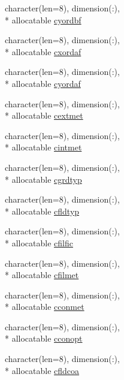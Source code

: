 \begin{DoxyCompactItemize}
\item 
character(len=8), dimension(\+:), \\*
allocatable \hyperlink{classmod__oasis__namcouple_ae1debe43f1c5cffeeb1d0d9ab563f4c4}{cyordbf}
\item 
character(len=8), dimension(\+:), \\*
allocatable \hyperlink{classmod__oasis__namcouple_ab52bc27bf5898cc85dce0fc60feb9320}{cxordaf}
\item 
character(len=8), dimension(\+:), \\*
allocatable \hyperlink{classmod__oasis__namcouple_a68de802180c51365e7d4bcc5180ac93b}{cyordaf}
\item 
character(len=8), dimension(\+:), \\*
allocatable \hyperlink{classmod__oasis__namcouple_a1066d92e6c9301bdb46ddda7edd7d29a}{cextmet}
\item 
character(len=8), dimension(\+:), \\*
allocatable \hyperlink{classmod__oasis__namcouple_ac9b9bb442cf77881bef2157c85e23495}{cintmet}
\item 
character(len=8), dimension(\+:), \\*
allocatable \hyperlink{classmod__oasis__namcouple_a795db0909c85ffadb601b744b5189ff5}{cgrdtyp}
\item 
character(len=8), dimension(\+:), \\*
allocatable \hyperlink{classmod__oasis__namcouple_ab139e7bad0413c79a5ad8e0837d3e0ef}{cfldtyp}
\item 
character(len=8), dimension(\+:), \\*
allocatable \hyperlink{classmod__oasis__namcouple_a6a69d927924d3fa391fdc3ec6cb78197}{cfilfic}
\item 
character(len=8), dimension(\+:), \\*
allocatable \hyperlink{classmod__oasis__namcouple_adf402f22f61893178fadcefe43b91102}{cfilmet}
\item 
character(len=8), dimension(\+:), \\*
allocatable \hyperlink{classmod__oasis__namcouple_a535fadd17426c228698e3a51fd54b605}{cconmet}
\item 
character(len=8), dimension(\+:), \\*
allocatable \hyperlink{classmod__oasis__namcouple_a240979dfe7369da899b0cfe2aeba4f9d}{cconopt}
\item 
character(len=8), dimension(\+:), \\*
allocatable \hyperlink{classmod__oasis__namcouple_af3a308fee2e4b00a1380035e41113d36}{cfldcoa}

\end{DoxyCompactItemize}
